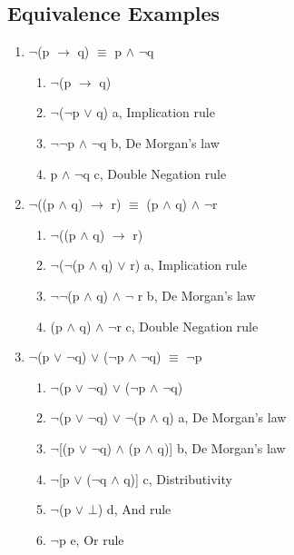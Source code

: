 \documentclass{report}
\begin{document}
\subsection{Equivalence Examples}
\begin{enumerate}

  \item $\neg$(p $\to$ q) $\equiv$ p $\land$ $\neg$q
  \begin{enumerate}
    \item $\neg$(p $\to$ q)
    \item $\neg$($\neg$p $\lor$ q) \hfill a, Implication rule
    \item $\neg$$\neg$p $\land$ $\neg$q \hfill b, De Morgan's law
    \item p $\land$ $\neg$q \hfill c, Double Negation rule
  \end{enumerate}
  
  \item $\neg$((p $\land$ q) $\to$ r) $\equiv$ (p $\land$ q) $\land$ $\neg$r
  \begin{enumerate}
    \item $\neg$((p $\land$ q) $\to$ r)
    \item $\neg$($\neg$(p $\land$ q) $\lor$ r) \hfill a, Implication rule
    \item $\neg$$\neg$(p $\land$ q) $\land$ $\neg$ r \hfill b, De Morgan's law
    \item (p $\land$ q) $\land$ $\neg$r \hfill c, Double Negation rule
  \end{enumerate}

  \item $\neg$(p $\lor$ $\neg$q) $\lor$ ($\neg$p $\land$ $\neg$q) $\equiv$ $\neg$p
  \begin{enumerate}
    \item $\neg$(p $\lor$ $\neg$q) $\lor$ ($\neg$p $\land$ $\neg$q)
    \item $\neg$(p $\lor$ $\neg$q) $\lor$ $\neg$(p $\land$ q) \hfill a, De Morgan's law
    \item $\neg$[(p $\lor$ $\neg$q) $\land$ (p $\land$ q)] \hfill b, De Morgan's law
    \item $\neg$[p $\lor$ ($\neg$q $\land$ q)] \hfill c, Distributivity
    \item $\neg$(p $\lor$ $\bot$) \hfill d, And rule
    \item $\neg$p \hfill e, Or rule
  \end{enumerate}
\end{enumerate}
\end{document}
